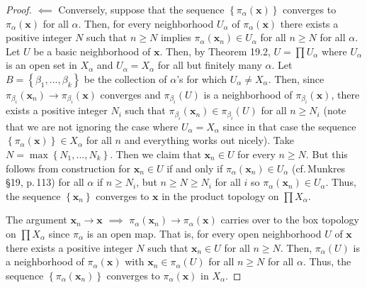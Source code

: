 \begin{proof}
$\impliedby$ Conversely, suppose that the sequence
$\left\{\pi_\alpha(\mathbf{x})\right\}$ converges to
$\pi_\alpha(\mathbf{x})$ for all $\alpha$. Then, for every
neighborhood $U_\alpha$ of $\pi_\alpha(\mathbf{x})$ there exists
a positive integer $N$ such that $n\geq N$ implies
$\pi_\alpha(\mathbf{x}_n)\in U_\alpha$ for all $n\geq N$ for all
$\alpha$. Let $U$ be a basic neighborhood of $\mathbf{x}$. Then,
by Theorem 19.2, $U=\prod U_\alpha$ where $U_\alpha$ is an
open set in $X_\alpha$ and $U_\alpha=X_\alpha$ for all but
finitely many $\alpha$. Let
$B=\left\{\beta_1,...,\beta_k\right\}$ be the collection of
$\alpha$'s for which $U_\alpha\neq X_\alpha$. Then, since
$\pi_{\beta_i}(\mathbf{x}_n)\to\pi_{\beta_i}(\mathbf{x})$
converges and $\pi_{\beta_i}(U)$ is a neighborhood of
$\pi_{\beta_i}(\mathbf{x})$, there exists a positive integer
$N_i$ such that $\pi_{\beta_i}(\mathbf{x}_n)\in\pi_{\beta_i}(U)$
for all $n\geq N_i$ (note that we are not ignoring the case where
$U_\alpha=X_\alpha$ since in that case the sequence
$\left\{\pi_\alpha(\mathbf{x})\right\}\in X_\alpha$ for all $n$
and everything works out nicely). Take
$N=\max\left\{N_1,...,N_k\right\}$. Then we claim that
$\mathbf{x}_n\in U$ for every $n\geq N$. But this follows from
construction for $\mathbf{x}_n\in U$ if and only if
$\pi_\alpha(\mathbf{x}_n)\in U_\alpha$ (cf.\,Munkres \S19,
p.\,113) for all $\alpha$ if $n\geq N_i$, but $n\geq N\geq N_i$
for all $i$ so $\pi_\alpha(\mathbf{x}_n)\in U_\alpha$. Thus, the
sequence $\left\{\mathbf{x}_n\right\}$ converges to $\mathbf{x}$
in the product topology on $\prod X_\alpha$.

The argument $\mathbf{x}_n\to\mathbf{x}$ $\implies$
$\pi_\alpha(\mathbf{x}_n)\to\pi_\alpha(\mathbf{x})$ carries over
to the box topology on $\prod X_\alpha$ since $\pi_\alpha$ is an
open map. That is, for every open neighborhood $U$ of
$\mathbf{x}$ there exists a positive integer $N$ such that
$\mathbf{x}_n\in U$ for all $n\geq N$. Then, $\pi_\alpha(U)$ is a
neighborhood of $\pi_\alpha(\mathbf{x})$ with
$\mathbf{x}_n\in\pi_\alpha(U)$ for all $n\geq N$ for all
$\alpha$. Thus, the sequence
$\left\{\pi_\alpha(\mathbf{x}_n)\right\}$ converges to
$\pi_\alpha(\mathbf{x})$ in $X_\alpha$.


\end{proof}

